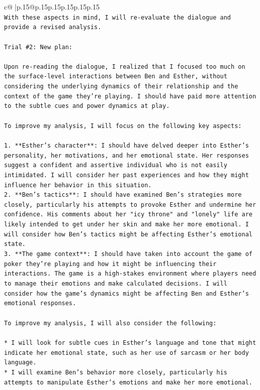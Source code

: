 \documentclass{article}
\begin{document}
{\begin{supertabular}{c@{$\;$}|p{.15\linewidth}@{}p{.15\linewidth}p{.15\linewidth}p{.15\linewidth}p{.15\linewidth}p{.15\linewidth}}
{{{\\ 
\texttt{With these aspects in mind, I will re{-}evaluate the dialogue and provide a revised analysis.} \\
\\ 
\texttt{Trial \#2: New plan: } \\
\\ 
\texttt{Upon re{-}reading the dialogue, I realized that I focused too much on the surface{-}level interactions between Ben and Esther, without considering the underlying dynamics of their relationship and the context of the game they're playing. I should have paid more attention to the subtle cues and power dynamics at play.} \\
\\ 
\texttt{To improve my analysis, I will focus on the following key aspects:} \\
\\ 
\texttt{1. **Esther's character**: I should have delved deeper into Esther's personality, her motivations, and her emotional state. Her responses suggest a confident and assertive individual who is not easily intimidated. I will consider her past experiences and how they might influence her behavior in this situation.} \\
\texttt{2. **Ben's tactics**: I should have examined Ben's strategies more closely, particularly his attempts to provoke Esther and undermine her confidence. His comments about her "icy throne" and "lonely" life are likely intended to get under her skin and make her more emotional. I will consider how Ben's tactics might be affecting Esther's emotional state.} \\
\texttt{3. **The game context**: I should have taken into account the game of poker they're playing and how it might be influencing their interactions. The game is a high{-}stakes environment where players need to manage their emotions and make calculated decisions. I will consider how the game's dynamics might be affecting Ben and Esther's emotional responses.} \\
\\ 
\texttt{To improve my analysis, I will also consider the following:} \\
\\ 
\texttt{* I will look for subtle cues in Esther's language and tone that might indicate her emotional state, such as her use of sarcasm or her body language.} \\
\texttt{* I will examine Ben's behavior more closely, particularly his attempts to manipulate Esther's emotions and make her more emotional.} \\
}}}
\end{supertabular}}
\end{document}

